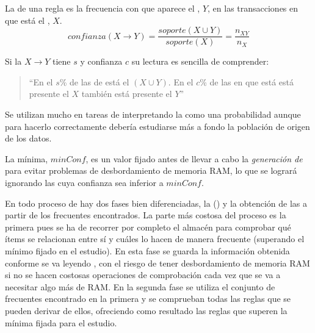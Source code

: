 \begin{Definition}
   La \confianza de una regla es la frecuencia con que aparece el \consecuente, $Y$, en las transacciones en que está el \antecedente, $X$.
  \begin{equation}\label{eq:1-3-2-confianza-AR}
    confianza(X \rightarrow Y) = \frac{soporte(X \cup Y)}{soporte(X)} = \frac{n_{XY}}{n_X}
  \end{equation}
\label{def:1-3-2-confianza}
\end{Definition}

Si la \ar $X \rightarrow Y$ tiene \soporte $s$ y confianza $c$ su lectura es sencilla de comprender: 
\begin{quote}
  "`En el $s$\% de las \transacciones de \D está el \itemset $(X \cup Y)$. En el $c$\% de las \transacciones en que está está presente el \itemset $X$ también está presente el \itemset $Y$"'
\end{quote}

Se utilizan mucho en tareas de \prediccion interpretando la \confianza como una probabilidad aunque para hacerlo correctamente debería estudiarse más a fondo la población de origen de los datos.

\begin{Definition}
   La \confianza mínima, $minConf$, es un valor fijado antes de llevar a cabo la \emph{generación de} \ars para evitar problemas de desbordamiento de memoria {RAM}, lo que se logrará ignorando las \ars cuya confianza sea inferior a $minConf$.
\label{def:1-3-2-confianza-minima}
\end{Definition}

En todo proceso de \arm hay dos fases bien diferenciadas, la \fim (\FIM) y la obtención de las \ars a partir de los \itemsets frecuentes encontrados. La parte más costosa del proceso es la primera pues se ha de recorrer por completo el almacén \D para comprobar qué ítems se relacionan entre sí y cuáles lo hacen de manera frecuente (superando el \soporte mínimo fijado en el estudio). En esta fase se guarda la información obtenida conforme se va leyendo \D, con el riesgo de tener desbordamiento de memoria RAM si no se hacen costosas operaciones de comprobación cada vez que se va a necesitar algo más de RAM. En la segunda fase se utiliza el conjunto de \itemsets frecuentes encontrado en la primera y se comprueban todas las reglas que se pueden derivar de ellos, ofreciendo como resultado las reglas que superen la \confianza mínima fijada para el estudio.

